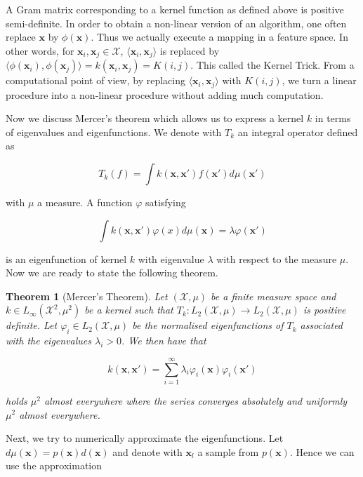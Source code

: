 \documentclass[12pt,a4paper,oneside]{book}
\newtheorem{Theorem}{Theorem}
\begin{document}
A Gram matrix corresponding to a kernel function as defined above is positive semi-definite. In order to obtain a non-linear version of an algorithm, one often replace $\bm{x}$ by $\phi(\bm{x})$. Thus we actually execute a mapping in a feature space. In other words, for $\bm{x}_i,\bm{x}_j \in \mathcal{X}$, $\langle \bm{x}_i, \bm{x}_j \rangle$ is replaced by $\langle \phi (\bm{x}_i) , \phi (\bm{x}_j) \rangle =k(\bm{x}_i,\bm{x}_j) = K(i,j)$. This called the Kernel Trick. From a computational point of view, by replacing $\langle \bm{x}_i, \bm{x}_j \rangle$ with $K(i,j)$, we turn a linear procedure into a non-linear procedure without adding much computation. 

Now we discuss Mercer's theorem which allows us to express a kernel $k$ in terms of eigenvalues and eigenfunctions. We denote with $T_k$  an integral operator defined as 

\begin{equation}
T_k (f) = \int k(\bm{x}, \bm{x}') f(\bm{x}') d \mu(\bm{x}')
\end{equation}

with $\mu$ a measure. A function $\varphi$ satisfying 

\begin{equation}
\int k(\bm{x},\bm{x}') \varphi(x) d \mu(\bm{x}) = \lambda \varphi(\bm{x}')
\end{equation}

is an eigenfunction of kernel $k$ with eigenvalue $\lambda$ with respect to the measure $\mu$. Now we are ready to state the following theorem.

\begin{Theorem}[Mercer's Theorem]\label{Functional_mercer}
Let $(\mathcal{X}, \mu)$ be a finite measure space and $k \in L_{\infty} (\mathcal{X}^2, \mu^2)$ be a kernel such that $T_k : L_2(\mathcal{X}, \mu) \rightarrow L_2(\mathcal{X}, \mu)$ is positive definite. Let $\varphi_i \in L_2(\mathcal{X},\mu)$ be the normalised eigenfunctions of $T_k$ associated with the eigenvalues $\lambda_i > 0$. We then have that 

\begin{equation}
k(\bm{x},\bm{x}') = \sum\limits_{i=1}^{\infty} \lambda_i \varphi_i(\bm{x}) \varphi_i(\bm{x}')
\end{equation}

holds $\mu^2$ almost everywhere where the series converges absolutely and uniformly $\mu^2$ almost everywhere.
\end{Theorem}

Next, we try to numerically approximate the eigenfunctions. Let $d \mu(\bm{x}) = p(\bm{x})d(\bm{x})$ and denote with $\bm{x}_l$ a sample from $p(\bm{x})$. Hence we can use the approximation
\end{document}
